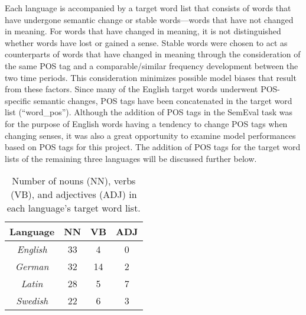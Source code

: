Each language is accompanied by a target word list that consists of words that have undergone semantic change or stable words—words that have not changed in meaning. For words that have changed in meaning, it is not distinguished whether words have lost or gained a sense. Stable words were chosen to act as counterparts of words that have changed in meaning through the consideration of the same POS tag and a comparable/similar frequency development between the two time periods. This consideration minimizes possible model biases that result from these factors. \citep{dubossarsky-etal-2017-outta} Since many of the English target words underwent POS-specific semantic changes, POS tags have been concatenated in the target word list (“word\_pos”). Although the addition of POS tags in the SemEval task was for the purpose of English words having a tendency to change POS tags when changing senses, it was also a great opportunity to examine model performances based on POS tags for this project. The addition of POS tags for the target word lists of the remaining three languages will be discussed further below.
 
\begin{table}[h]
\small
\centering
\begin{tabular}{|c|c|c|c|}
\hline
\textbf{Language} & \textbf{NN} & \textbf{VB} & \textbf{ADJ} \\ \hline
\textit{English}                          & 33          & 4           & 0            \\ \hline
\textit{German}                           & 32          & 14          & 2            \\ \hline
\textit{Latin}                            & 28          & 5           & 7            \\ \hline
\textit{Swedish}                          & 22          & 6           & 3            \\ \hline
\end{tabular}
\caption{Number of nouns (NN), verbs (VB), and adjectives (ADJ) in each language's target word list.}
\label{tab:postag-breakdown}
\end{table}

